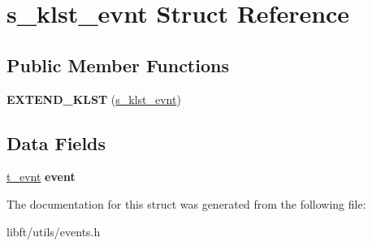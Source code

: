 \hypertarget{structs__klst__evnt}{}\section{s\+\_\+klst\+\_\+evnt Struct Reference}
\label{structs__klst__evnt}
\subsection*{Public Member Functions}
\begin{DoxyCompactItemize}
\item 
\hypertarget{structs__klst__evnt_add886bc4bfe34ac5a335fb50310992dd}{}{\bfseries E\+X\+T\+E\+N\+D\+\_\+\+K\+L\+S\+T} (\hyperlink{structs__klst__evnt}{s\+\_\+klst\+\_\+evnt})\label{structs__klst__evnt_add886bc4bfe34ac5a335fb50310992dd}

\end{DoxyCompactItemize}
\subsection*{Data Fields}
\begin{DoxyCompactItemize}
\item 
\hypertarget{structs__klst__evnt_a7ad64feb78d4f24df38c36ba3aecadb3}{}\hyperlink{structs__evnt}{t\+\_\+evnt} {\bfseries event}\label{structs__klst__evnt_a7ad64feb78d4f24df38c36ba3aecadb3}

\end{DoxyCompactItemize}


The documentation for this struct was generated from the following file\+:\begin{DoxyCompactItemize}
\item 
libft/utils/events.\+h\end{DoxyCompactItemize}
